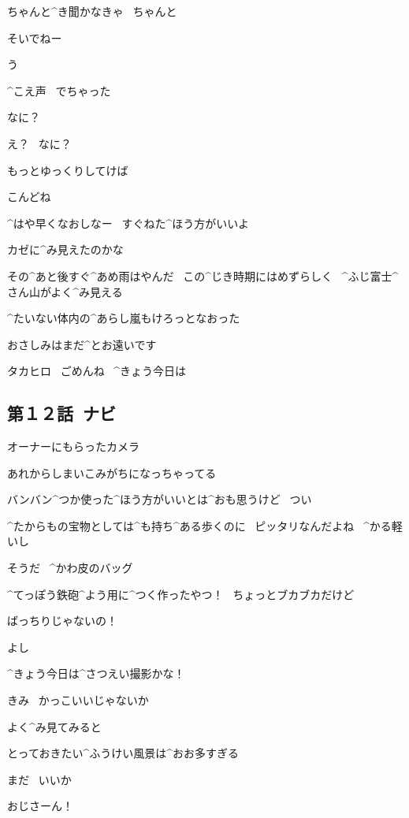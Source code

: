 \Alpha ちゃんと^{き}{聞}かなきゃ
\ ちゃんと

\page
\Takahiro そいでねー

\Alpha う

\Alpha ^{こえ}{声}
\ でちゃった

\Takahiro なに？

\Alpha え？
\ なに？

\page
\Alpha もっとゆっくりしてけば

\Takahiro こんどね

\Takahiro ^{はや}{早}くなおしなー
\ すぐねた^{ほう}{方}がいいよ

\Alpha カゼに^{み}{見}えたのかな

\page
\Alpha その^{あと}{後}すぐ^{あめ}{雨}はやんだ
\ この^{じき}{時期}にはめずらしく
\ ^{ふじ}{富士}^{さん}{山}がよく^{み}{見}える

\Alpha ^{たいない}{体内}の^{あらし}{嵐}もけろっとなおった

\page
\Alpha おさしみはまだ^{とお}{遠}いです

\Alpha タカヒロ
\ ごめんね
\ ^{きょう}{今日}は


\subsection{第１２話\ ナビ}

\page[68]
\Alpha オーナーにもらったカメラ

\Alpha あれからしまいこみがちになっちゃってる

\Alpha バンバン^{つか}{使}った^{ほう}{方}がいいとは^{おも}{思}うけど
\ つい

\Alpha ^{たからもの}{宝物}としては^{も}{持}ち^{ある}{歩}くのに
\ ピッタリなんだよね
\ ^{かる}{軽}いし

\page
\Alpha そうだ
\ ^{かわ}{皮}のバッグ

\Alpha ^{てっぽう}{鉄砲}^{よう}{用}に^{つく}{作}ったやつ！
\ ちょっとブカブカだけど

\Alpha ばっちりじゃないの！

\Alpha よし

\Alpha ^{きょう}{今日}は^{さつえい}{撮影}かな！

\page
\Alpha きみ
\ かっこいいじゃないか

\page
\Alpha よく^{み}{見}てみると

\Alpha とっておきたい^{ふうけい}{風景}は^{おお}{多}すぎる

\Alpha まだ
\ いいか

\page
\Alpha おじさーん！

